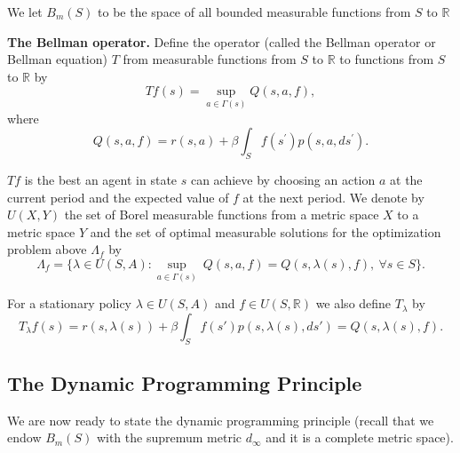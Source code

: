 \documentclass[letter,11pt]{article}
\begin{document}
We let $B_{m}(S)$ to be the space of all bounded measurable functions from $S$ to $\mathbb{R}$

\textbf{The Bellman operator.} Define the operator (called the Bellman operator or Bellman equation) $T$ from measurable functions from $S$ to $\mathbb{R}$ to functions from  $S$ to $\mathbb{R}$ by
\begin{equation*}Tf(s) =\sup _{a \in \Gamma (s)}Q(s ,a ,f), 
\end{equation*}
where 
\begin{equation}Q(s ,a ,f) =r(s ,a) +\beta \int _{S}f(s^{ \prime })p(s ,a ,ds^{ \prime }). \label{eq:h}
\end{equation}

$Tf$ is the best an agent in state $s$ can achieve by choosing an action $a$ at the current period and the expected value of $f$ at the next period.  We denote by $U(X,Y)$ the set of Borel measurable functions from a metric space $X$ to a metric space $Y$ 
and  the set of optimal measurable solutions for the optimization problem above $\Lambda _{f}$ by
$$\Lambda _{f} = \{ \lambda \in U(S,A): \sup _{a \in \Gamma(s)} \ Q(s,a,f) = Q(s,\lambda(s),f), \  \forall s \in S \} .$$

 For a stationary policy $\lambda \in U(S,A)$ and $f \in U(S,\mathbb{R})$ we also define $T_{\lambda}$ by
\begin{equation}
    T_{\lambda}f(s) =  r(s,\lambda(s)) + \beta \int _{S} f(s') p(s,\lambda(s),ds') = Q(s,\lambda(s),f).
\end{equation}





\subsection{The Dynamic Programming  Principle}
 
We are now ready to state the dynamic programming principle (recall that we endow $B_{m}(S)$ with the supremum metric $d_{\infty}$ and it is a complete metric space).
\end{document}
